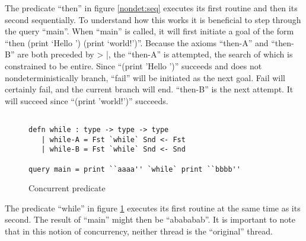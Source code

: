 The predicate “then” in figure \ref{nondet:seq} executes its first routine and then its second sequentially.
To understand how this works it is beneficial to step through the query
“main”. When “main” is called, it will first initiate a goal of the form “then (print ‘Hello
’) (print ‘world!’)”. Because the axioms “then-A” and “then-B” are both preceded by > |,
the “then-A” is attempted, the search of which is constrained to be entire. Since “(print
’Hello ’)” succeeds and does not nondeterministically branch, “fail” will be initiated as
the next goal. Fail will certainly fail, and the current branch will end. “then-B” is the
next attempt. It will succeed since “(print ’world!’)” succeeds.

\begin{figure}[H]
\begin{lstlisting}

defn while : type -> type -> type
   | while-A = Fst `while` Snd <- Fst
   | while-B = Fst `while` Snd <- Snd

query main = print ``aaaa'' `while` print ``bbbb''

\end{lstlisting}
\caption{Concurrent predicate}
\label{nondet:con}
\end{figure}


The predicate “while” in figure \ref{nondet:con} executes its first routine at the same time as its
second. The result of “main” might then be “abababab”. It is important to note that in this notion of concurrency, neither thread is the ``original'' thread.
